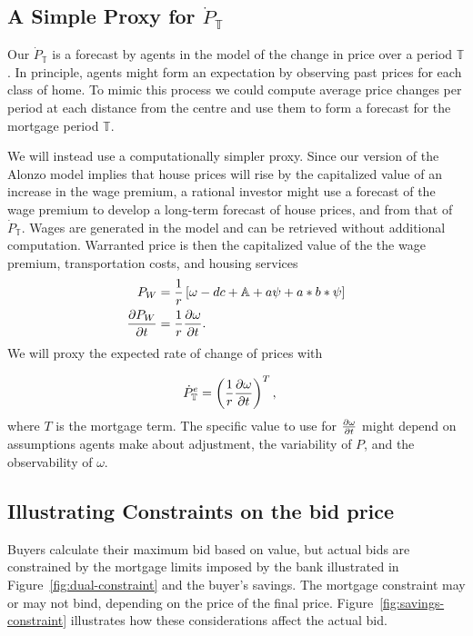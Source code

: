 {\subsection{A Simple Proxy for $\dot P_\mathbb{T}$}

Our $\dot P_\mathbb{T}$ is a forecast by agents in the model of the change in price over a period $\mathbb{T}$. In principle, agents might form an expectation by observing past prices for each class of home. To mimic this process we could compute average price changes per period at each distance from the centre and use them to form a forecast for the mortgage period $\mathbb{T}$. 

We will instead use a computationally simpler proxy. Since our version of the \gls{Alonzo model} implies that house prices will rise by the capitalized value of an increase in the wage premium, a rational investor might use a forecast of the wage premium to develop a long-term forecast of house prices, and from that of $\dot P_\mathbb{T}$. Wages are generated in the model and can be retrieved without additional computation. 
Warranted price is then the capitalized value of the the wage premium, transportation costs, and housing services 
\begin{align}
P_W &=\frac{1}{r}\left[\omega - {dc} + \mathbb{A} + a\psi\nonumber  + a*b*\psi\right] \nonumber\\
\frac{\partial P_W}{\partial t} &= \frac{1}{r}\frac{\partial \omega}{\partial t}. \nonumber
\end{align}
We will  proxy the expected rate of change of prices with

\begin{align}
\dot P^e_\mathbb{T} &= \left(\frac{1}{r}\frac{\partial \omega}{\partial t} \right)^T, \nonumber
\end{align}
where $T$ is the mortgage term. The specific value to use for $\frac{\partial \omega}{\partial t}$ might depend on assumptions agents make about adjustment,  the variability of $P$, and the observability of $\omega$.


\subsection{Illustrating  Constraints on the bid price}
 
Buyers calculate their maximum bid based on value, but actual bids are constrained by the mortgage limits imposed by the bank illustrated in Figure~\ref{fig:dual-constraint} and the buyer's savings. The mortgage constraint may or may not bind, depending on the price of the final price. Figure~\ref{fig:savings-constraint} illustrates how these considerations affect the actual bid. 

}

